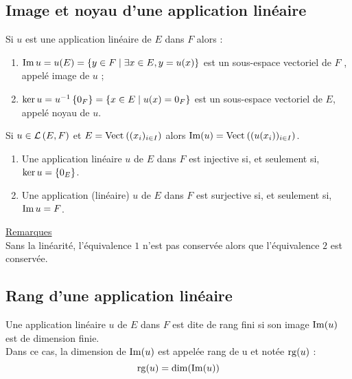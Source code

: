 \subsection{Image et noyau d’une application linéaire}
\begin{defprop}
    Si \(u\) est une application linéaire de \(E\) dans \(F\) alors :
    \begin{enumerate}
        \item \(\operatorname{Im} u = u(E) = \left\lbrace y \in  F \;\middle|\; \exists x \in  E, y = u(x)\right\rbrace\) est un sous-espace vectoriel de \(F\) , appelé image de \(u\) ;
        \item \(\ker u = u^{-1} \left\lbrace0_F \right\rbrace = \left\lbrace x \in  E \;\middle|\; u(x) = 0_F \right\rbrace\) est un sous-espace vectoriel de \(E\), appelé noyau de \(u\).
    \end{enumerate}
\end{defprop}
\begin{defprop}
    Si \(u \in  \mathcal{L}\left(E,F\right)\) et \(E = \Vect{(x_i)_{i\in I} } \) alors \(\im(u) = \Vect{(u(x_i))_{i\in I} }\).
\end{defprop}
\begin{defprop}
  \begin{enumerate}  
        \item Une application linéaire \(u\) de \(E\) dans \(F\) est injective si, et seulement si, \(\ker u = \left\lbrace0_E \right\rbrace\).
        \item Une application (linéaire) \(u\) de \(E\) dans \(F\) est surjective si, et seulement si, \(\operatorname{Im} u = F \).
    \end{enumerate}

        \underline{Remarques}\\
        Sans la linéarité, l’équivalence \(1\) n’est pas conservée alors que l’équivalence \(2\) est conservée.
\end{defprop}

\subsection{Rang d’une application linéaire}
\begin{defi}
    Une application linéaire \(u\) de \(E\) dans \(F\) est dite de rang fini si son image \(\operatorname{Im}(u)\) est de dimension finie.\\
    Dans ce cas, la dimension de \(\operatorname{Im} (u)\) est appelée rang de u et notée \(\operatorname{rg}(u)\) :
    \[\operatorname{rg}(u) = \dim (\operatorname{Im} (u))\]
\end{defi}

